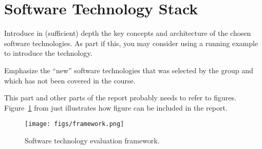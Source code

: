 \section{Software Technology Stack}
\label{sec:technology}

Introduce in (sufficient) depth the key concepts and architecture of the chosen software technologies. As part if this, you may consider using a running example to introduce the technology.

Emphasize the “new” software technologies that was selected by the group and which has not been covered in the course.

This part and other parts of the report probably needs to refer to
figures. Figure~\ref{fig:framework} from \cite{brown:96} just
illustrates how figure can be included in the report.

\begin{figure}[H]
  \centering
  \texttt{[image: figs/framework.png]}
  \caption{Software technology evaluation framework.}
  \label{fig:framework}
\end{figure}
